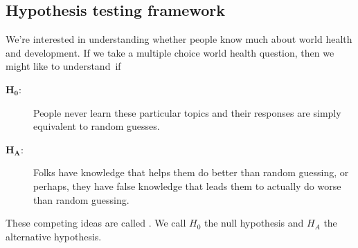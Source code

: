 \subsection{Hypothesis testing framework}

We're interested in understanding whether people know much
about world health and development. If we take a multiple choice
world health question, then we might like to understand~if
\begin{description}
\item[$\mathbf{H_0}$:]
    People never learn these particular topics and their
    responses are simply equivalent to random guesses.
\item[$\mathbf{H_A}$:]
    Folks have knowledge that helps them do better
    than random guessing, or perhaps, they have false knowledge
    that leads them to actually do worse than random guessing.
\end{description}
%
These competing ideas are called .
We call $H_0$ the null hypothesis and $H_A$ the alternative
hypothesis.

